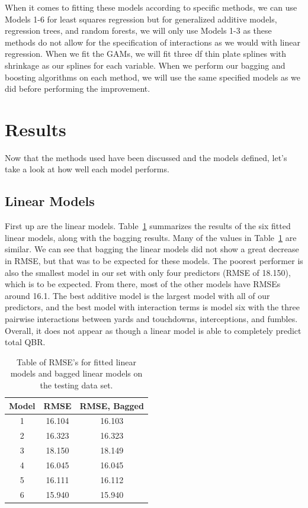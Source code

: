 \documentclass[12pt]{article}\usepackage[]{graphicx}\usepackage[]{color}
\begin{document}
When it comes to fitting these models according to specific methods, we can use Models 1-6 for least squares regression but for generalized additive models, regression trees, and random forests, we will only use Models 1-3 as these methods do not allow for the specification of interactions as we would with linear regression. When we fit the GAMs, we will fit three df thin plate splines with shrinkage as our splines for each variable. When we perform our bagging and boosting algorithms on each method, we will use the same specified models as we did before performing the improvement.

\section{Results}
Now that the methods used have been discussed and the models defined, let's take a look at how well each model performs.

\subsection{Linear Models}
First up are the linear models. Table~\ref{tab:lmres} summarizes the results of the six fitted linear models, along with the bagging results. Many of the values in Table~\ref{tab:lmres} are similar. We can see that bagging the linear models did not show a great decrease in RMSE, but that was to be expected for these models. The poorest performer is also the smallest model in our set with only four predictors (RMSE of 18.150), which is to be expected. From there, most of the other models have RMSEs around 16.1. The best additive model is the largest model with all of our predictors, and the best model with interaction terms is model six with the three pairwise interactions between yards and touchdowns, interceptions, and fumbles. Overall, it does not appear as though a linear model is able to completely predict total QBR.

\begin{table}[h]
\centering
\begin{tabular}{|c|c|c|}
\hline
Model & RMSE & RMSE, Bagged \\
\hline
1 & 16.104 & 16.103 \\
\hline
2 & 16.323 & 16.323 \\
\hline
3 & 18.150 & 18.149 \\
\hline
4 & 16.045 & 16.045 \\
\hline
5 & 16.111 & 16.112 \\
\hline
6 & 15.940 & 15.940 \\
\hline
\end{tabular}
\captionsetup{font=footnotesize,labelfont=footnotesize}
\caption{\label{tab:lmres} Table of RMSE's for fitted linear models and bagged linear models on the testing data set.}
\end{table}
\end{document}
